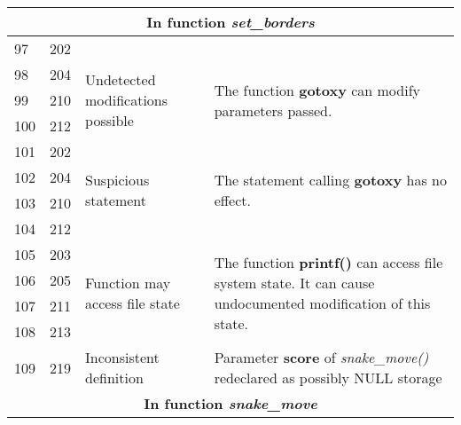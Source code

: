 \documentclass[]{article}
\begin{document}
\begin{longtable}{ |p{0.5cm}|p{0.75cm}|p{3cm}|p{9cm}|  }
		\hline 
		\multicolumn{4}{|c|}{\textbf{In function \textit{set\_borders}}} \\
		\hline 
		
		97 & 202 & & \\
		98 & 204 & \multirow{3}{80.0pt}{Undetected modifications possible}  & \multirow{3}{200.0pt}{The function \textbf{gotoxy} can modify parameters passed.} \\
		99 & 210 & & \\
		100 & 212 & & \\
		\hline 
		101 & 202 &  \multirow{4}{50.0pt}{Suspicious statement} & \multirow{4}{200.0pt}{The statement calling \textbf{gotoxy} has no effect.} 
		\\
		102 & 204 & & \\
		103 & 210 & & \\
		104 & 212 & & \\
		\hline 
		105 & 203 &  \multirow{4}{80.0pt}{Function may access file state} & \multirow{4}{200.0pt}{The function \textbf{printf()} can access file system state. It can cause undocumented modification of this state.} 
		\\
		106 & 205 & & \\
		107 & 211 & & \\
		108 & 213 & & \\
		\hline 
		109 & 219 & Inconsistent definition & Parameter \textbf{score} of \textit{snake\_move()} redeclared as possibly NULL storage\\
		
		\hline 
		\multicolumn{4}{|c|}{\textbf{In function \textit{snake\_move}}} \\
		\hline 
		

\end{longtable}
\end{document}
